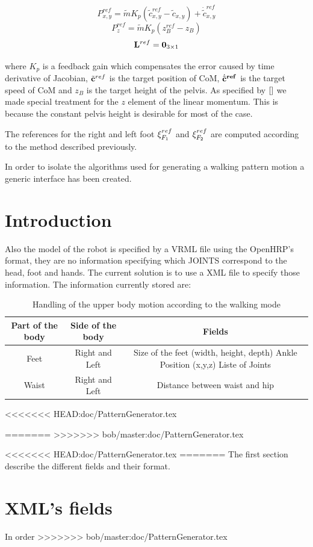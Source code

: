\begin{equation}
P^{ref}_{x,y} = \tilde{m}K_p (\tilde{c}_{x,y}^{ref} - \tilde{c}_{x,y} )+ \dot{\tilde{c}}^{ref}_{x,y}
\label{eq:XYLinearMomentum}
\end{equation}
\begin{equation}
P^{ref}_{z} = \tilde{m} K_p (z_B^{ref} - z_B)
\label{eq:ZLinearMomentum}
\end{equation}
\begin{equation}
{\bf L}^{ref} = {\bf 0}_{3 \times 1}
\end{equation}

where $K_p$ is a feedback gain which compensates the error caused by time derivative of Jacobian,
$\tilde{\bf c}^{ref}$ is the target position of CoM, $\dot{\tilde{\bf c}}^{ref}$ is the target
speed of CoM and $z_B$ is the target height of the pelvis. As specified by $\cite{}$
we made special treatment for the $z$ element of the linear momentum. This is because the constant
pelvis height is desirable for most of the case.
\par
The references for the right and left foot ${\bf \xi}^{ref}_{F_1}$ and ${\bf \xi}^{ref}_{F_2}$
are computed according to the method described previously.


In order to isolate the algorithms used for generating a walking pattern motion
a generic interface has been created. 


\section{Introduction}
Also the model of the robot is specified by a VRML file using the OpenHRP's format,
they are no information specifying which JOINTS correspond to the head, foot and hands.
The current solution is to use a XML file to specify those information.
The information currently stored are:
\begin{table}
\begin{tabular}{|c|c|c|} \hline
Part of the body & Side of the body & Fields \\ \hline \hline
Feet & Right and Left & 
Size of the feet (width, height, depth) \linebreak 
Ankle Position (x,y,z) \linebreak
Liste of Joints  \\ \hline
Waist & Right and Left & Distance between waist and hip \\ \hline
\end{tabular}
<<<<<<< HEAD:doc/PatternGenerator.tex
\caption{Handling of the upper body motion according to the walking mode}
=======
>>>>>>> bob/master:doc/PatternGenerator.tex
\end{table}
<<<<<<< HEAD:doc/PatternGenerator.tex
=======
The first section describe the different fields and their format.

\section{XML's fields}
In order 
>>>>>>> bob/master:doc/PatternGenerator.tex
